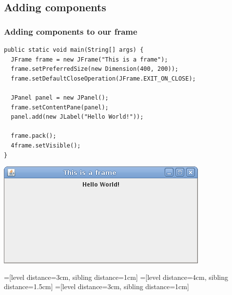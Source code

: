 \documentclass[10pt, handout]{beamer}
\begin{document}
\subsection{Adding components}
\begin{frame}[fragile]
  \frametitle{Adding components to our frame}
  \begin{verbatim}
public static void main(String[] args) {
  JFrame frame = new JFrame("This is a frame");
  frame.setPreferredSize(new Dimension(400, 200));
  frame.setDefaultCloseOperation(JFrame.EXIT_ON_CLOSE);

  JPanel panel = new JPanel();
  frame.setContentPane(panel);
  panel.add(new JLabel("Hello World!"));

  frame.pack();
  4frame.setVisible();
}
\end{verbatim}
\begin{center}
\includegraphics[width=0.6\linewidth]{label}
\end{center}
\end{frame}

=[level distance=3cm, sibling distance=1cm]
=[level distance=4cm, sibling distance=1.5cm]
=[level distance=3cm, sibling distance=1cm]
\end{document}
